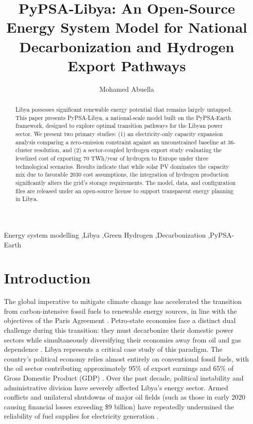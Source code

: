 \documentclass[preprint,12pt]{elsarticle}
\begin{document}
\begin{frontmatter}

\title{PyPSA-Libya: An Open-Source Energy System Model for National Decarbonization and Hydrogen Export Pathways}

\author[a]{Mohamed Abuella}

\begin{abstract}
Libya possesses significant renewable energy potential that remains largely untapped. This paper presents PyPSA-Libya, a national-scale model built on the PyPSA-Earth framework, designed to explore optimal transition pathways for the Libyan power sector. We present two primary studies: (1) an electricity-only capacity expansion analysis comparing a zero-emission constraint against an unconstrained baseline at 36-cluster resolution, and (2) a sector-coupled hydrogen export study evaluating the levelized cost of exporting 70 TWh/year of hydrogen to Europe under three technological scenarios. Results indicate that while solar PV dominates the capacity mix due to favorable 2030 cost assumptions, the integration of hydrogen production significantly alters the grid's storage requirements. The model, data, and configuration files are released under an open-source license to support transparent energy planning in Libya.
\end{abstract}

\begin{keyword}
Energy system modelling \sep Libya \sep Green Hydrogen \sep Decarbonization \sep PyPSA-Earth
\end{keyword}

\end{frontmatter}


\section{Introduction}
\label{sec:introduction}

The global imperative to mitigate climate change has accelerated the transition from carbon-intensive fossil fuels to renewable energy sources, in line with the objectives of the Paris Agreement \cite{almaktar2021prospects, alanazi2025renewable}. Petro-state economies face a distinct dual challenge during this transition: they must decarbonize their domestic power sectors while simultaneously diversifying their economies away from oil and gas dependence \cite{almaktar2021prospects, eljrushi1990solar}. Libya represents a critical case study of this paradigm. The country's political economy relies almost entirely on conventional fossil fuels, with the oil sector contributing approximately 95\% of export earnings and 65\% of Gross Domestic Product (GDP) \cite{almaktar2021prospects}. Over the past decade, political instability and administrative division have severely affected Libya's energy sector. Armed conflicts and unilateral shutdowns of major oil fields (such as those in early 2020 causing financial losses exceeding \$9 billion) have repeatedly undermined the reliability of fuel supplies for electricity generation \cite{almaktar2021prospects}.
\end{document}
